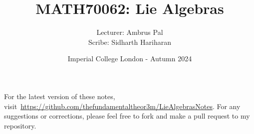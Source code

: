 \documentclass[a4paper, 12pt, openany, oneside]{book}
\title{\vspace{-2em}MATH70062: Lie Algebras}
\author{Lecturer: Ambrus Pal \\ Scribe: Sidharth Hariharan}
\date{Imperial College London - Autumn 2024}
\begin{document}
\setlength{\abovedisplayskip}{7.5pt}  %
\setlength{\belowdisplayskip}{7.5pt}  %
\setlength{\abovedisplayshortskip}{2pt}
\setlength{\belowdisplayshortskip}{2pt}

\maketitle
\thispagestyle{empty}

\tableofcontents
\thispagestyle{empty}

\newpage

\nocite{*}





% 

\newpage




\printbibliography[prenote=mybibnote]
\thispagestyle{empty}

For the latest version of these notes, visit~\url{https://github.com/thefundamentaltheor3m/LieAlgebrasNotes}. For any suggestions or corrections, please feel free to fork and make a pull request to my repository.
\end{document}
